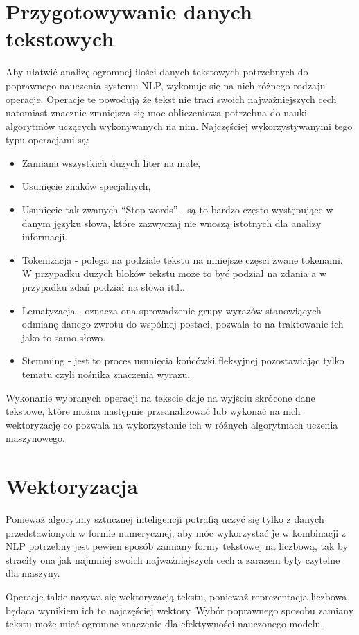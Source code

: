 \section{Przygotowywanie danych tekstowych}
Aby ułatwić analizę ogromnej ilości danych tekstowych potrzebnych do poprawnego nauczenia systemu NLP,
wykonuje się na nich różnego rodzaju operacje. Operacje te powodują że tekst nie traci swoich najważniejszych cech 
natomiast znacznie zmniejsza się moc obliczeniowa potrzebna do nauki algorytmów uczących wykonywanych na nim. 
Najczęściej wykorzystywanymi tego typu operacjami są: 
\begin{itemize}
    \item Zamiana wszystkich dużych liter na małe,
    \item Usunięcie znaków specjalnych,
    \item Usunięcie tak zwanych ``Stop words'' - są to bardzo często występujące w danym języku słowa, które 
    zazwyczaj nie wnoszą istotnych dla analizy informacji.
    \item Tokenizacja - polega na podziale tekstu na mniejsze częsci zwane tokenami. W przypadku dużych bloków 
    tekstu może to być podział na zdania a w przypadku zdań podział na słowa itd..
    \item Lematyzacja - oznacza ona sprowadzenie grupy wyrazów stanowiących odmianę danego zwrotu do wspólnej postaci,
    pozwala to na traktowanie ich jako to samo słowo.
    \item Stemming - jest to proces usunięcia końcówki fleksyjnej pozostawiając tylko tematu czyli nośnika znaczenia 
    wyrazu.
\end{itemize}
Wykonanie wybranych operacji na tekscie daje na wyjściu skrócone dane tekstowe, które można następnie przeanalizować lub 
wykonać na nich wektoryzację co pozwala na wykorzystanie ich w różnych algorytmach uczenia maszynowego. 
\section{Wektoryzacja}
Ponieważ algorytmy sztucznej inteligencji potrafią uczyć się tylko z danych przedstawionych w formie numerycznej, aby móc 
wykorzystać je w kombinacji z NLP potrzebny jest pewien sposób zamiany formy tekstowej na liczbową, tak by straciły ona jak najmniej
swoich najważniejszych cech a zarazem były czytelne dla maszyny. 

Operacje takie nazywa się wektoryzacją tekstu, ponieważ 
reprezentacja liczbowa będąca wynikiem ich to najczęściej wektory. 
Wybór poprawnego sposobu zamiany tekstu może mieć ogromne znaczenie dla efektywności nauczonego modelu.

